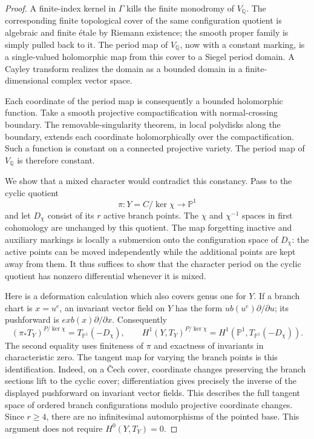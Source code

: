 \documentclass[11pt]{article}
\newcommand{\Q}{\mathbb Q}
\theoremstyle{plain}
\theoremstyle{definition}
\theoremstyle{remark}
\numberwithin{equation}{section}
\begin{document}
\begin{proof}
A finite-index kernel in $\Gamma$ kills the finite monodromy of
$V_\Q$.  The corresponding finite topological cover of the same
configuration quotient is algebraic and finite \'etale by Riemann
existence; the smooth proper family is simply pulled back to it.
The period map of $V_\Q$, now with a constant marking,
is a single-valued holomorphic map from this cover to a Siegel
period domain.  A Cayley transform realizes the domain as a bounded
domain in a finite-dimensional complex vector space.

Each coordinate of the period map is consequently a bounded
holomorphic function.  Take a smooth projective compactification
with normal-crossing boundary.  The removable-singularity theorem,
in local polydisks along the boundary, extends each coordinate
holomorphically over the compactification.  Such a function is
constant on a connected projective variety.  The period map of
$V_\Q$ is therefore constant.

We show that a mixed character would contradict this constancy.
Pass to the cyclic quotient
\[
 \pi:Y=C/\ker\chi\longrightarrow\mathbb P^1
\]
and let $D_\chi$ consist of its $r$ active branch points.  The $\chi$ and
$\chi^{-1}$ spaces in first cohomology are unchanged by this
quotient.  The map forgetting inactive and auxiliary markings is
locally a submersion onto the configuration space of $D_\chi$: the
active points can be moved independently while the additional
points are kept away from them.  It thus suffices to show that the
character period on the cyclic quotient has nonzero differential
whenever it is mixed.

Here is a deformation calculation which also covers genus one for
$Y$.  If a branch chart is $x=u^e$, an invariant vector field on
$Y$ has the form $u b(u^e)\partial/\partial u$; its pushforward is
$e x b(x)\partial/\partial x$.  Consequently
\begin{equation}\label{p4:sphere-tangent}
 (\pi_*T_Y)^{P/\ker\chi}=T_{\mathbb P^1}(-D_\chi),\qquad
 H^1(Y,T_Y)^{P/\ker\chi}
   =H^1(\mathbb P^1,T_{\mathbb P^1}(-D_\chi)).
\end{equation}
The second equality uses finiteness of $\pi$ and exactness of
invariants in characteristic zero.  The tangent map for varying the
branch points is this identification.  Indeed, on a \v{C}ech cover,
coordinate changes preserving the branch sections lift to the
cyclic cover; differentiation gives precisely the inverse of the
displayed pushforward on invariant vector fields.  This describes
the full tangent space of ordered branch configurations modulo
projective coordinate changes.  Since $r\ge4$, there are no
infinitesimal automorphisms of the pointed base.  This argument does
not require $H^0(Y,T_Y)=0$.


\end{proof}
\end{document}
